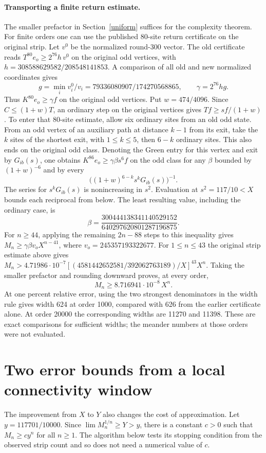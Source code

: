 \documentclass[11pt]{article}
\newcommand{\wnum}{4581442652581}
\newcommand{\wden}{392062763189}
\begin{document}
\paragraph{Transporting a finite return estimate.}
The smaller prefactor in Section~\ref{uniform} suffices for the complexity theorem. For finite orders one can use the published 80-site return certificate on the original strip. Let \(v^0\) be the normalized round-300 vector. The old certificate reads \(T^{80}e_o\ge 2^{76}h\,v^0\) on the original odd vertices, with \(h=308588629582/208548141853\). A comparison of all old and new normalized coordinates gives
\[
 g=\min_i v_i^0/v_i=79336080907/174270568865,\qquad
 \gamma=2^{76}hg.
\]
Thus \(K^{80}e_o\ge\gamma f\) on the original odd vertices. Put \(w=474/4096\). Since \(C\le(1+w)T\), an ordinary step on the original vertices gives \(Tf\ge sf/(1+w)\). To enter that 80-site estimate, allow six ordinary sites from an old odd state. From an odd vertex of an auxiliary path at distance \(k-1\) from its exit, take the \(k\) sites of the shortest exit, with \(1\le k\le5\), then \(6-k\) ordinary sites. This also ends on the original odd class. Denoting the Green entry for this vertex and exit by \(G_{ib}(s)\), one obtains \(K^{86}e_o\ge\gamma\beta s^6 f\) on the odd class for any \(\beta\) bounded by \((1+w)^{-6}\) and by every
\[
           \big((1+w)^{6-k}s^kG_{ib}(s)\big)^{-1}.
\]
The series for \(s^kG_{ib}(s)\) is nonincreasing in \(s^2\). Evaluation at \(s^2=117/10<X\) bounds each reciprocal from below. The least resulting value, including the ordinary case, is
\[
 \beta=\frac{300444138341140529152}{640297620801287196875}.
\]
For \(n\ge44\), applying the remaining \(2n-88\) steps to this inequality gives \(M_n\ge\gamma\beta v_o X^{n-41}\), where \(v_o=245357193322677\). For \(1\le n\le43\) the original strip estimate above gives \(M_n>4.71986\cdot10^{-7}[(\wnum/\wden)/X]^{43}X^n\). Taking the smaller prefactor and rounding downward proves, at every order,
\[
                      M_n\ge 8.716941\cdot10^{-8}\, X^n.
\]
At one percent relative error, using the two strongest denominators in the width rule gives width 624 at order 1000, compared with 626 from the earlier certificate alone. At order 20000 the corresponding widths are 11270 and 11398. These are exact comparisons for sufficient widths; the meander numbers at those orders were not evaluated.



\section{Two error bounds from a local connectivity window}
The improvement from \(X\) to \(Y\) also changes the cost of approximation. Let \(y=117701/10000\). Since \(\lim M_n^{1/n}\ge Y>y\), there is a constant \(c>0\) such that \(M_n\ge c y^n\) for all \(n\ge1\). The algorithm below tests its stopping condition from the observed strip count and so does not need a numerical value of \(c\).
\end{document}
